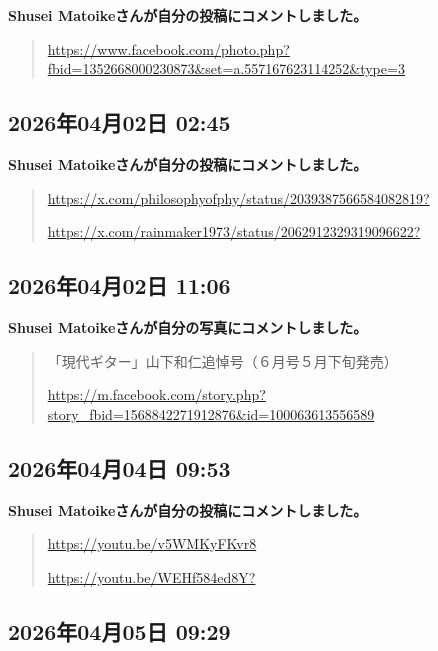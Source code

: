 \textbf{Shusei Matoikeさんが自分の投稿にコメントしました。}

\begin{quote}
\url{https://www.facebook.com/photo.php?fbid=1352668000230873&set=a.557167623114252&type=3}
\end{quote}

\subsection*{2026年04月02日 02:45}

\textbf{Shusei Matoikeさんが自分の投稿にコメントしました。}

\begin{quote}
\url{https://x.com/philosophyofphy/status/2039387566584082819?}

\url{https://x.com/rainmaker1973/status/2062912329319096622?}
\end{quote}

\subsection*{2026年04月02日 11:06}

\textbf{Shusei Matoikeさんが自分の写真にコメントしました。}

\begin{quote}
「現代ギター」山下和仁追悼号（６月号５月下旬発売）

\url{https://m.facebook.com/story.php?story_fbid=1568842271912876&id=100063613556589}
\end{quote}

\subsection*{2026年04月04日 09:53}

\textbf{Shusei Matoikeさんが自分の投稿にコメントしました。}

\begin{quote}
\url{https://youtu.be/v5WMKyFKvr8}

\url{https://youtu.be/WEHf584ed8Y?}
\end{quote}

\subsection*{2026年04月05日 09:29}

